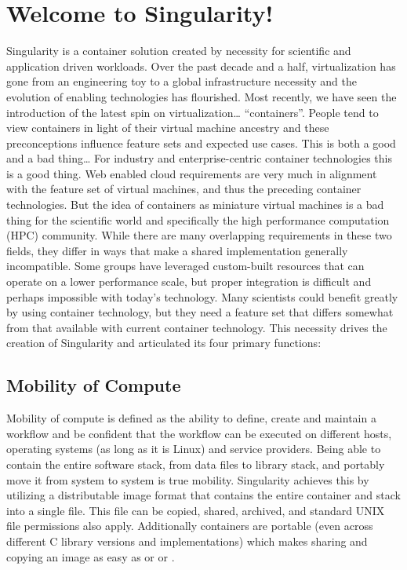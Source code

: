 \documentclass[letterpaper,10pt,english]{sphinxmanual}
\begin{document}
\section{Welcome to Singularity!}
\label{\detokenize{introduction:welcome-to-singularity}}
Singularity is a container solution created by necessity for
scientific and application driven workloads.
Over the past decade and a half, virtualization has gone from an
engineering toy to a global infrastructure necessity and the evolution
of enabling technologies has flourished. Most recently, we have seen
the introduction of the latest spin on virtualization… “containers”.
People tend to view containers in light of their virtual machine
ancestry and these preconceptions influence feature sets and expected
use cases. This is both a good and a bad thing…
For industry and enterprise-centric container technologies this is a
good thing. Web enabled cloud requirements are very much in alignment
with the feature set of virtual machines, and thus the preceding
container technologies. But the idea of containers as miniature
virtual machines is a bad thing for the scientific world and
specifically the high performance computation (HPC) community. While
there are many overlapping requirements in these two fields, they
differ in ways that make a shared implementation generally
incompatible. Some groups have leveraged custom-built resources that
can operate on a lower performance scale, but proper integration is
difficult and perhaps impossible with today’s technology.
Many scientists could benefit greatly by using container technology,
but they need a feature set that differs somewhat from that available
with current container technology. This necessity drives the creation
of Singularity and articulated its four primary functions:


\subsection{Mobility of Compute}
\label{\detokenize{introduction:mobility-of-compute}}
Mobility of compute is defined as the ability to define, create and
maintain a workflow and be confident that the workflow can be executed
on different hosts, operating systems (as long as it is Linux) and
service providers. Being able to contain the entire software stack,
from data files to library stack, and portably move it from system to
system is true mobility.
Singularity achieves this by utilizing a distributable image format
that contains the entire container and stack into a single file. This
file can be copied, shared, archived, and standard UNIX file
permissions also apply. Additionally containers are portable (even
across different C library versions and implementations) which makes
sharing and copying an image as easy as  or  or .
\end{document}
